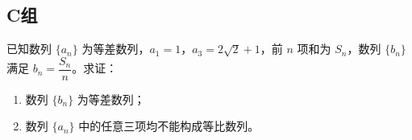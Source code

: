 \subsection*{C组}

\begin{exercise}[选修二P41页]
	已知数列 $\{a_n\}$ 为等差数列，$a_1 = 1$，$a_3 = 2\sqrt{2}+1$，前 $n$ 项和为 $S_n$，数列 $\{b_n\}$ 满足 $b_n = \dfrac{S_n}{n}$。求证：
	\begin{enumerate}
		\item[(1)] 数列 $\{b_n\}$ 为等差数列；
		\item[(2)] 数列 $\{a_n\}$ 中的任意三项均不能构成等比数列。
	\end{enumerate}
\end{exercise}

\stopexercise
